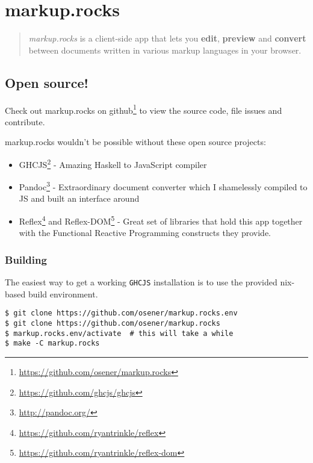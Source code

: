 \section{markup.rocks}\label{markup.rocks}

\begin{quote}
\emph{markup.rocks} is a client-side app that lets you \textbf{edit},
\textbf{preview} and \textbf{convert} between documents written in
various markup languages in your browser.
\end{quote}

\subsection{Open source!}\label{open-source}

Check out markup.rocks on
github\footnote{\url{https://github.com/osener/markup.rocks}} to view
the source code, file issues and contribute.

markup.rocks wouldn't be possible without these open source projects:

\begin{itemize}
\itemsep1pt\parskip0pt
\item
  GHCJS\footnote{\url{https://github.com/ghcjs/ghcjs}} - Amazing Haskell
  to JavaScript compiler
\item
  Pandoc\footnote{\url{http://pandoc.org/}} - Extraordinary document
  converter which I shamelessly compiled to JS and built an interface
  around
\item
  Reflex\footnote{\url{https://github.com/ryantrinkle/reflex}} and
  Reflex-DOM\footnote{\url{https://github.com/ryantrinkle/reflex-dom}} -
  Great set of libraries that hold this app together with the Functional
  Reactive Programming constructs they provide.
\end{itemize}

\subsubsection{Building}\label{building}

The easiest way to get a working \texttt{GHCJS} installation is to use
the provided nix-based build environment.

\begin{verbatim}
$ git clone https://github.com/osener/markup.rocks.env
$ git clone https://github.com/osener/markup.rocks
$ markup.rocks.env/activate  # this will take a while
$ make -C markup.rocks
\end{verbatim}